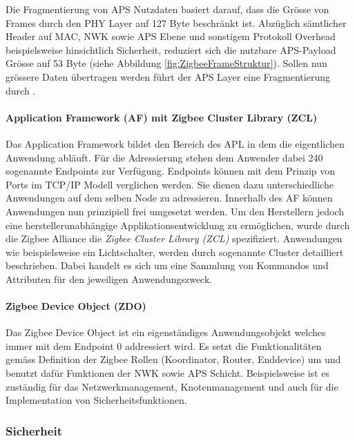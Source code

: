 Die Fragmentierung von APS Nutzdaten basiert darauf, dass die Grösse von Frames durch den PHY Layer auf 127 Byte beschränkt ist.
Abzüglich sämtlicher Header auf MAC, NWK sowie APS Ebene und sonstigem Protokoll Overhead beispielsweise hinsichtlich Sicherheit, reduziert sich die nutzbare APS-Payload Grösse auf 53 Byte (siehe Abbildung \ref{fig:ZigbeeFrameStruktur}).
Sollen nun grössere Daten übertragen werden führt der APS Layer eine Fragmentierung durch \cite[S.~279 - 299]{markus_krause_rainer_konrad_zigbee_2014}.


\paragraph{Application Framework (AF) mit Zigbee Cluster Library (ZCL)}\label{par:ZigbeeAFZCL}
Das Application Framework bildet den Bereich des APL in dem die eigentlichen Anwendung abläuft. Für die Adressierung stehen dem Anwender dabei 240 sogenannte Endpoints zur Verfügung. Endpoints können mit dem Prinzip von Ports im TCP/IP Modell verglichen werden.
Sie dienen dazu unterschiedliche Anwendungen auf dem selben Node zu adressieren.
Innerhalb des AF können Anwendungen nun prinzipiell frei umgesetzt werden.
Um den Herstellern jedoch eine herstellerunabhängige Applikationsentwicklung zu ermöglichen, wurde durch die Zigbee Alliance die \textit{Zigbee Cluster Library (ZCL)} spezifiziert.
Anwendungen wie beispielsweise ein Lichtschalter, werden durch sogenannte Cluster detailliert beschrieben.
Dabei handelt es sich um eine Sammlung von Kommandos und Attributen für den jeweiligen Anwendungszweck.

\paragraph{Zigbee Device Object (ZDO)}\label{par:ZigbeeDeviceObject}
Das Zigbee Device Object ist ein eigenständiges Anwendungsobjekt welches immer mit dem Endpoint 0 addressiert wird.
Es setzt die Funktionalitäten gemäss Definition der Zigbee Rollen (Koordinator, Router, Enddevice) um und benutzt dafür Funktionen der NWK sowie APS Schicht.
Beispielsweise ist es zuständig für das Netzwerkmanagement, Knotenmanagement und auch für die Implementation von Sicherheitsfunktionen.

\subsubsection{Sicherheit}\label{subsucsec:ZigbeeSicherheit}


